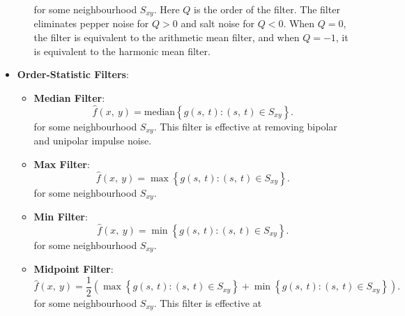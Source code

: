 \documentclass{article}
\begin{document}
\begin{itemize}
\begin{itemize}
\begin{equation*}
                    \end{equation*}
                    for some neighbourhood \(S_{xy}\). Here \(Q\) is the order of
                    the filter. The filter eliminates pepper noise for \(Q > 0\)
                    and salt noise for \(Q < 0\). When \(Q = 0\), the filter is
                    equivalent to the arithmetic mean filter, and when \(Q = -1\),
                    it is equivalent to the harmonic mean filter.
          \end{itemize}
    \item \textbf{Order-Statistic Filters}:
          \begin{itemize}
              \item \textbf{Median Filter}:
                    \begin{equation*}
                        \hat{f}\left( x,\: y \right) = \text{median}\left\{ g\left( s,\: t \right) : \left( s,\: t \right) \in S_{xy} \right\}.
                    \end{equation*}
                    for some neighbourhood \(S_{xy}\). This filter is effective at
                    removing bipolar and unipolar impulse noise.
              \item \textbf{Max Filter}:
                    \begin{equation*}
                        \hat{f}\left( x,\: y \right) = \max\left\{ g\left( s,\: t \right) : \left( s,\: t \right) \in S_{xy} \right\}.
                    \end{equation*}
                    for some neighbourhood \(S_{xy}\).
              \item \textbf{Min Filter}:
                    \begin{equation*}
                        \hat{f}\left( x,\: y \right) = \min\left\{ g\left( s,\: t \right) : \left( s,\: t \right) \in S_{xy} \right\}.
                    \end{equation*}
                    for some neighbourhood \(S_{xy}\).
              \item \textbf{Midpoint Filter}:
                    \begin{equation*}
                        \hat{f}\left( x,\: y \right) = \frac{1}{2} \left( \max\left\{ g\left( s,\: t \right) : \left( s,\: t \right) \in S_{xy} \right\} + \min\left\{ g\left( s,\: t \right) : \left( s,\: t \right) \in S_{xy} \right\} \right).
                    \end{equation*}
                    for some neighbourhood \(S_{xy}\). This filter is effective at

\end{itemize}
\end{itemize}
\end{document}
